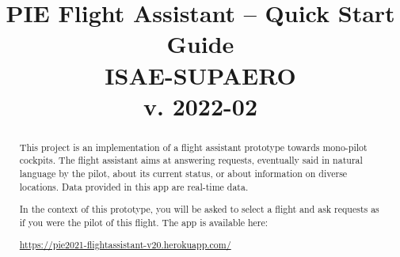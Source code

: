 \documentclass[12pt,oneside,a4]{article}
\title{PIE Flight Assistant -- Quick Start Guide\\ \vspace{.2em} \large{ISAE-SUPAERO} \\ \small{v. 2022-02}\\ \vspace{-4em}}
\author{
    }
\date{}
\newcommand{\linkdeploy}{https://pie2021-flightassistant-v20.herokuapp.com/}
\begin{document}
\maketitle
\vfill
\begin{center}
\end{center}
\vfill

\begin{abstract}
This project is an implementation of a flight assistant prototype towards mono-pilot cockpits.
The flight assistant aims at answering requests, eventually said in natural language by the pilot,
about its current status, or about information on diverse locations.
Data provided in this app are real-time data.

In the context of this prototype, you will be asked to select a flight and ask requests
as if you were the pilot of this flight.
The app is available here:
\begin{center}
    \vspace{-.5em}
    \url{\linkdeploy}
    \vspace{-.5em}
\end{center}
\end{abstract}

\clearpage
\tableofcontents

\clearpage

\end{document}
